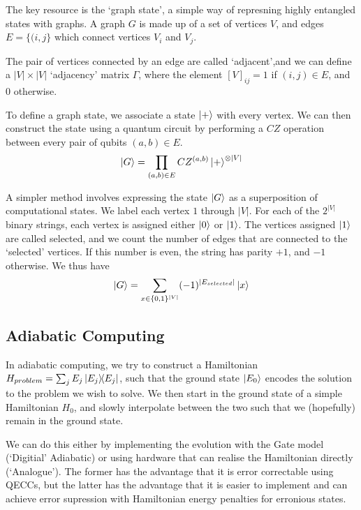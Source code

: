 \documentclass[11pt]{article}
\begin{document}
The key resource is the `graph state', a simple way of represning highly entangled states with graphs. A graph $G$ is made up of a set of vertices $V$, and edges $E=\{(i,j\}$ which connect vertices $V_{i}$ and $V_{j}$.

The pair of vertices connected by an edge are called `adjacent',and we can define a $|V|\times|V|$ `adjacency' matrix $\Gamma$, where the element $[V]_{ij}=1$ if $(i,j)\in E$, and 0 otherwise.

To define a graph state, we associate a state $\ket{+}$ with every vertex. We can then construct the state using a quantum circuit by performing a $CZ$ operation between every pair of qubits $(a,b)\in E$.
\begin{equation}
    \ket{G}=\prod_{(a,b)\in E}CZ^{(a,b)}\ket{+}^{\otimes|V|}
\end{equation}

A simpler method involves expressing the state $\ket{G}$ as a superposition of computational states. We label each vertex $1$ through $|V|$. For each of the $2^{|V|}$ binary strings, each vertex is assigned either $\ket{0}$ or $\ket{1}$. The vertices assigned $\ket{1}$ are called selected, and we count the number of edges that are connected to the `selected' vertices. If this number is even, the string has parity $+1$, and $-1$ otherwise. We thus have
\begin{equation}
    \ket{G}=\sum_{x\in\{0,1\}^{|V|}}(-1)^{|E_{selected}|}\ket{x}
\end{equation}

\subsection*{Adiabatic Computing}

In adiabatic computing, we try to construct a Hamiltonian $H_{problem}=\sum_{j}E_{j}\ketbra{E_{j}}{E_{j}}$, such that the ground state $\ket{E_{0}}$ encodes the solution to the problem we wish to solve. We then start in the ground state of a simple Hamiltonian $H_{0}$, and slowly interpolate between the two such that we (hopefully) remain in the ground state.

We can do this either by implementing the evolution with the Gate model (`Digitial' Adiabatic) or using hardware that can realise the Hamiltonian directly (`Analogue'). The former has the advantage that it is error correctable using QECCs, but the latter has the advantage that it is easier to implement and can achieve error supression with Hamiltonian energy penalties for erronious states.
\end{document}

